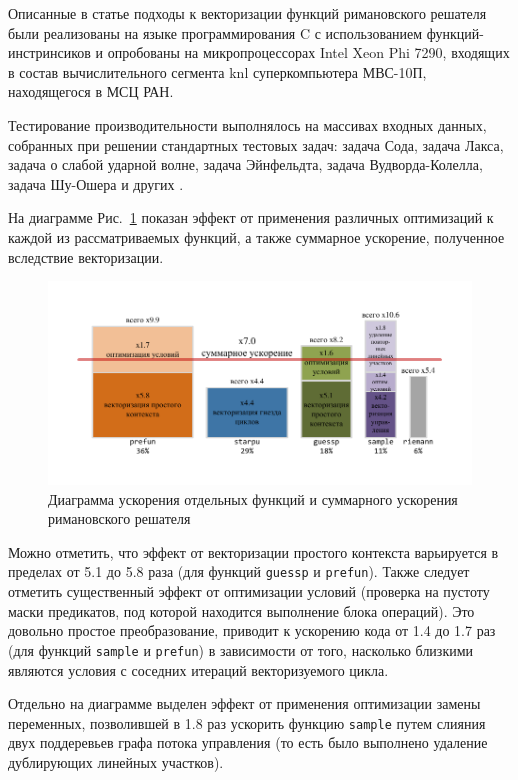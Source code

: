 \documentclass[utf8]{psta}
\begin{document}
Описанные в статье подходы к векторизации функций римановского решателя были реализованы на языке программирования C с использованием функций-инстринсиков и опробованы на микропроцессорах Intel Xeon Phi 7290, входящих в состав вычислительного сегмента knl суперкомпьютера МВС-10П, находящегося в МСЦ РАН.

Тестирование производительности выполнялось на массивах входных данных, собранных при решении стандартных тестовых задач: задача Сода, задача Лакса, задача о слабой ударной волне, задача Эйнфельдта, задача Вудворда-Колелла, задача Шу-Ошера и других \cite{BulVolTest}.

На диаграмме Рис.~\ref{pic:perf} показан эффект от применения различных оптимизаций к каждой из рассматриваемых функций, а также суммарное ускорение, полученное вследствие векторизации.

\begin{figure}
\includegraphics[width=12cm]{pics/pic_perf}
\caption{Диаграмма ускорения отдельных функций и суммарного ускорения римановского решателя}
\label{pic:perf}
\end{figure}

Можно отметить, что эффект от векторизации простого контекста варьируется в пределах от 5.1 до 5.8 раза (для функций \texttt{guessp} и \texttt{prefun}).
Также следует отметить существенный эффект от оптимизации условий (проверка на пустоту маски предикатов, под которой находится выполнение блока операций).
Это довольно простое преобразование, приводит к ускорению кода от 1.4 до 1.7 раз (для функций \texttt{sample} и \texttt{prefun}) в зависимости от того, насколько близкими являются условия с соседних итераций векторизуемого цикла.

Отдельно на диаграмме выделен эффект от применения оптимизации замены переменных, позволившей в 1.8 раз ускорить функцию \texttt{sample} путем слияния двух поддеревьев графа потока управления (то есть было выполнено удаление дублирующих линейных участков).
\end{document}
